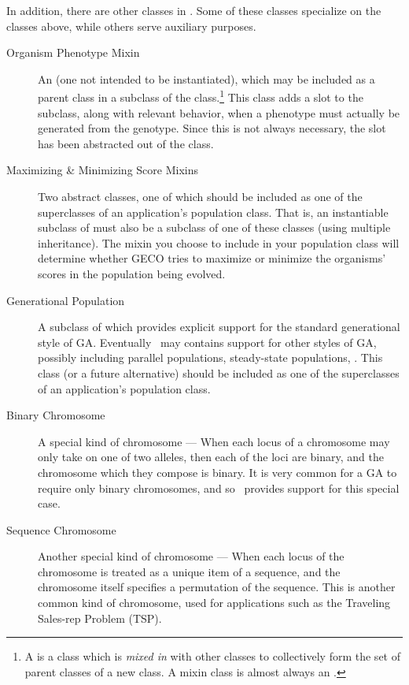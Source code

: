 {\samepage
In addition, there are other classes in \geco.  Some of these classes 
specialize on the classes above, while others serve auxiliary purposes.  

\begin{description}

\item [Organism Phenotype Mixin]
 An  (one not intended to be instantiated), which may be included as a parent
class in a subclass of the  class.\footnote{A  is a class which is {\em mixed in} with other classes to collectively form
the set of parent classes of a new class. A mixin class is almost always an
.} This class adds a  slot to the subclass,
along with relevant behavior, when a phenotype must actually be generated from the
genotype. Since this is not always necessary, the  slot has been
abstracted out of the  class.

\item [Maximizing \& Minimizing Score Mixins] Two abstract classes, one of which
should be included as one of the superclasses of an application's population class.
That is, an instantiable subclass of  must also be a subclass of
one of these classes (using multiple inheritance). The mixin you choose to include in
your population class will determine whether GECO tries to maximize or minimize the
organisms' scores in the population being evolved.

\item [Generational Population] A subclass of  which provides
explicit support for the standard generational style of GA. Eventually \geco\ may
contains support for other styles of GA, possibly including parallel populations,
steady-state populations, \etc. This class (or a future alternative) should be included as
one of the superclasses of an application's population class.

\item [Binary Chromosome] A special kind of chromosome --- When each locus of a
chromosome may only take on one of two alleles, then each of the loci are binary, and the
chromosome which they compose is binary. It is very common for a GA to require only
binary chromosomes, and so \geco\ provides support for this special case.

\item [Sequence Chromosome] Another special kind of chromosome --- When each locus of the
chromosome is treated as a unique item of a sequence, and the chromosome itself specifies
a permutation of the sequence. This is another common kind of chromosome, used for
applications such as the Traveling Sales-rep Problem (TSP).
	

\end{description}}
